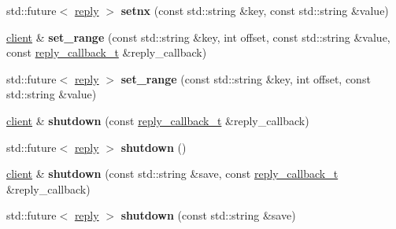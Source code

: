 \begin{DoxyCompactItemize}
\mbox{\label{classcpp__redis_1_1client_a1ab0db92e48716812e4b30b268ce29ea}} 
std\+::future$<$ \mbox{\hyperlink{classcpp__redis_1_1reply}{reply}} $>$ {\bfseries setnx} (const std\+::string \&key, const std\+::string \&value)
\item 
\mbox{\label{classcpp__redis_1_1client_a3c1a2d69d9473de409f9102b61496f47}} 
\mbox{\hyperlink{classcpp__redis_1_1client}{client}} \& {\bfseries set_range} (const std\+::string \&key, int offset, const std\+::string \&value, const \mbox{\hyperlink{classcpp__redis_1_1client_af7a65eb21aa25230bfbb0b0203c4fc04}{reply\+\_\+callback\+\_\+t}} \&reply\+\_\+callback)
\item 
\mbox{\label{classcpp__redis_1_1client_a628f79b8f8e424cdd4b70c076c21338a}} 
std\+::future$<$ \mbox{\hyperlink{classcpp__redis_1_1reply}{reply}} $>$ {\bfseries set_range} (const std\+::string \&key, int offset, const std\+::string \&value)
\item 
\mbox{\label{classcpp__redis_1_1client_acdb7064ddc309b1dbc6681ae559cc189}} 
\mbox{\hyperlink{classcpp__redis_1_1client}{client}} \& {\bfseries shutdown} (const \mbox{\hyperlink{classcpp__redis_1_1client_af7a65eb21aa25230bfbb0b0203c4fc04}{reply\+\_\+callback\+\_\+t}} \&reply\+\_\+callback)
\item 
\mbox{\label{classcpp__redis_1_1client_ae457a1b446eff2e264452eb35de72d37}} 
std\+::future$<$ \mbox{\hyperlink{classcpp__redis_1_1reply}{reply}} $>$ {\bfseries shutdown} ()
\item 
\mbox{\label{classcpp__redis_1_1client_aca186e9b705a566203a47e8b29f99a28}} 
\mbox{\hyperlink{classcpp__redis_1_1client}{client}} \& {\bfseries shutdown} (const std\+::string \&save, const \mbox{\hyperlink{classcpp__redis_1_1client_af7a65eb21aa25230bfbb0b0203c4fc04}{reply\+\_\+callback\+\_\+t}} \&reply\+\_\+callback)
\item 
\mbox{\label{classcpp__redis_1_1client_a8587aeb1044e85ae580cd9661ea826dc}} 
std\+::future$<$ \mbox{\hyperlink{classcpp__redis_1_1reply}{reply}} $>$ {\bfseries shutdown} (const std\+::string \&save)
\item 

\end{DoxyCompactItemize}
